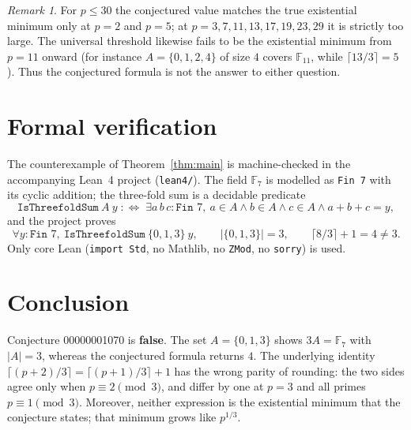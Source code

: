 \documentclass[11pt]{article}
\theoremstyle{definition}
\theoremstyle{remark}
\newtheorem{remark}[theorem]{Remark}
\begin{document}
\begin{remark}
For $p \le 30$ the conjectured value matches the true existential minimum only
at $p = 2$ and $p = 5$; at $p = 3, 7, 11, 13, 17, 19, 23, 29$ it is strictly
too large. The universal threshold likewise fails to be the existential
minimum from $p = 11$ onward (for instance $A = \{0,1,2,4\}$ of size $4$
covers $\mathbb{F}_{11}$, while $\lceil 13/3 \rceil = 5$). Thus the
conjectured formula is not the answer to either question.
\end{remark}

\section{Formal verification}

The counterexample of Theorem~\ref{thm:main} is machine-checked in the
accompanying Lean~4 project (\texttt{lean4/}). The field $\mathbb{F}_7$ is
modelled as \texttt{Fin 7} with its cyclic addition; the three-fold sum is a
decidable predicate
\[
  \texttt{IsThreefoldSum}\ A\ y \;:\Longleftrightarrow\;
  \exists a\,b\,c : \texttt{Fin }7,\ a \in A \wedge b \in A \wedge c \in A
  \wedge a + b + c = y ,
\]
and the project proves
\[
  \forall y : \texttt{Fin }7,\ \texttt{IsThreefoldSum}\ \{0,1,3\}\ y,
  \qquad |\{0,1,3\}| = 3,
  \qquad \lceil 8/3 \rceil + 1 = 4 \neq 3 .
\]
Only core Lean (\texttt{import Std}, no Mathlib, no \texttt{ZMod}, no
\texttt{sorry}) is used.

\section{Conclusion}

Conjecture 00000001070 is \textbf{false}. The set $A = \{0,1,3\}$ shows
$3A = \mathbb{F}_7$ with $|A| = 3$, whereas the conjectured formula returns
$4$. The underlying identity $\lceil (p+2)/3 \rceil = \lceil (p+1)/3 \rceil +
1$ has the wrong parity of rounding: the two sides agree only when
$p \equiv 2 \pmod 3$, and differ by one at $p = 3$ and all primes
$p \equiv 1 \pmod 3$. Moreover, neither expression is the existential minimum
that the conjecture states; that minimum grows like $p^{1/3}$.
\end{document}
